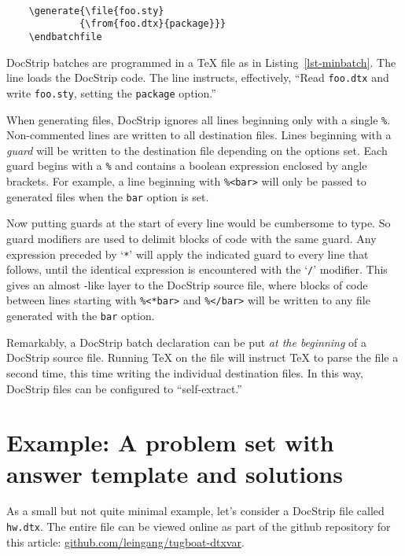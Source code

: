 \documentclass{ltugboat}
\newcommand{\fn}[1]{\texttt{#1}}  %
\newcommand{\opt}[1]{\texttt{#1}} %
\newcommand{\docstrip}{\texorpdfstring{\textsf{DocStrip}}{DocStrip}}
\begin{document}
\begin{lstlisting}[float,
    numbers=none,
    caption={A minimal \docstrip{} batch file},
    label={lst-minbatch}
]
     
    \generate{\file{foo.sty}
             {\from{foo.dtx}{package}}}
    \endbatchfile
\end{lstlisting}

\docstrip{} batches are programmed in a \TeX{} file as in
Listing~\ref{lst-minbatch}.  The  line loads the \docstrip{} code.
The  line instructs, effectively, ``Read \fn{foo.dtx} and write
\fn{foo.sty}, setting the \opt{package} option.''

When generating files, \docstrip{} ignores all lines beginning only with a
single \verb!%!.  Non-commented lines are written to all destination files.
Lines beginning with a \emph{guard} will be written to the destination file
depending on the options set.  Each guard begins with a \verb!%! and contains a
boolean expression enclosed by angle brackets.  For example, a line beginning
with \verb|%<bar>| will only be passed to generated files when the \opt{bar}
option is set.

Now putting guards at the start of every line would be cumbersome to type.  So
guard modifiers are used to delimit blocks of code with the same guard.  Any
expression preceded by `\verb|*|' will apply the indicated guard to every line
that follows, until the identical expression is encountered with the `\verb|/|'
modifier.  This gives an almost -like layer to the \docstrip{} source
file, where blocks of code between lines starting with \verb!%<*bar>! and
\verb!%</bar>! will be written to any file generated with the \opt{bar} option.

Remarkably, a \docstrip{} batch declaration can be put \emph{at the beginning}
of a \docstrip{} source file.  Running \TeX{} on the file will instruct \TeX{}
to parse the file a second time, this time writing the individual destination
files.  In this way, \docstrip{} files can be configured to ``self-extract.''

\section{Example: A problem set with answer template and solutions}
\label{sec-exam}

As a small but not quite minimal example, let's consider a \docstrip{} file
called \fn{hw.dtx}.  The entire file can be viewed online as part of the github
repository for this article: \url{github.com/leingang/tugboat-dtxvar}.
\end{document}
